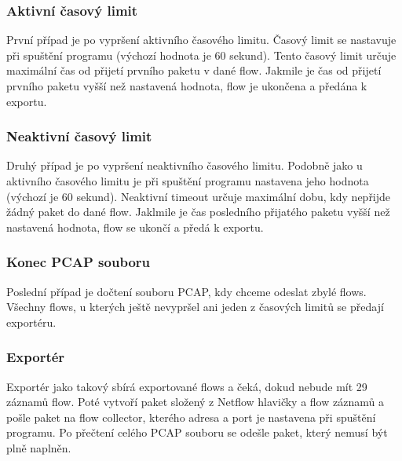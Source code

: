 \documentclass{article}
\begin{document}
\subsubsection{Aktivní časový limit}
První případ je po vypršení aktivního časového limitu. Časový limit se
nastavuje při spuštění programu (výchozí hodnota je 60 sekund). Tento časový
limit určuje maximální čas od přijetí prvního paketu v dané flow. Jakmile je
čas od přijetí prvního paketu vyšší než nastavená hodnota, flow je ukončena
a předána k exportu.

\subsubsection{Neaktivní časový limit}
Druhý případ je po vypršení neaktivního časového limitu. Podobně jako u
aktivního časového limitu je při spuštění programu nastavena jeho hodnota
(výchozí je 60 sekund). Neaktivní timeout určuje maximální dobu, kdy nepřijde
žádný paket do dané flow. Jaklmile je čas posledního přijatého paketu vyšší
než nastavená hodnota, flow se ukončí a předá k exportu.

\subsubsection{Konec PCAP souboru}
Poslední případ je dočtení souboru PCAP, kdy chceme odeslat zbylé flows.
Všechny flows, u kterých ještě nevypršel ani jeden z časových limitů se předají
exportéru.

\subsubsection{Exportér}
Exportér jako takový sbírá exportované flows a čeká, dokud nebude mít 29
záznamů flow. Poté vytvoří paket složený z Netflow hlavičky a flow záznamů a
pošle paket na flow collector, kterého adresa a port je nastavena při spuštění
programu. Po přečtení celého PCAP souboru se odešle paket, který nemusí být
plně naplněn.

\nocite{*}
\printbibliography[title={Reference}]
\end{document}
